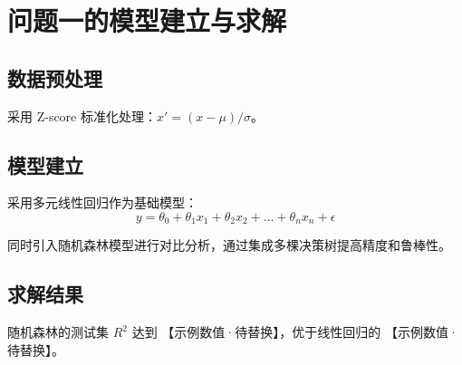 \section{问题一的模型建立与求解}

\subsection{数据预处理}

采用 Z-score 标准化处理：$x' = (x - \mu) / \sigma$。

\subsection{模型建立}

采用多元线性回归作为基础模型：
\[
  y = \theta_0 + \theta_1 x_1 + \theta_2 x_2 + \dots + \theta_n x_n + \epsilon
\]

同时引入随机森林模型进行对比分析，通过集成多棵决策树提高精度和鲁棒性。

\subsection{求解结果}

随机森林的测试集 $R^2$ 达到 【示例数值·待替换】，优于线性回归的 【示例数值·待替换】。
